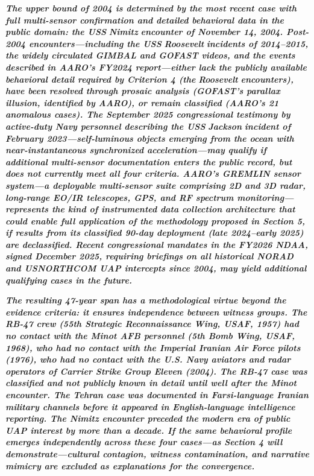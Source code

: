 \documentclass[11pt,letterpaper]{article}
\begin{document}
\textbf{\textit{The upper bound of 2004 is determined by the most recent case with full multi-sensor confirmation and detailed behavioral data in the public domain: the USS }}\textbf{\textit{Nimitz}}\textbf{\textit{ encounter of November 14, 2004. Post-2004 encounters---including the USS }}\textbf{\textit{Roosevelt}}\textbf{\textit{ incidents of 2014--2015, the widely circulated GIMBAL and GOFAST videos, and the events described in AARO's FY2024 report---either lack the publicly available behavioral detail required by Criterion 4 (the }}\textbf{\textit{Roosevelt}}\textbf{\textit{ encounters), have been resolved through prosaic analysis (GOFAST's parallax illusion, identified by AARO), or remain classified (AARO's 21 anomalous cases). The September 2025 congressional testimony by active-duty Navy personnel describing the USS }}\textbf{\textit{Jackson}}\textbf{\textit{ incident of February 2023---self-luminous objects emerging from the ocean with near-instantaneous synchronized acceleration---may qualify if additional multi-sensor documentation enters the public record, but does not currently meet all four criteria. AARO's GREMLIN sensor system---a deployable multi-sensor suite comprising 2D and 3D radar, long-range EO/IR telescopes, GPS, and RF spectrum monitoring---represents the kind of instrumented data collection architecture that could enable full application of the methodology proposed in Section 5, if results from its classified 90-day deployment (late 2024--early 2025) are declassified. Recent congressional mandates in the FY2026 NDAA, signed December 2025, requiring briefings on all historical NORAD and USNORTHCOM UAP intercepts since 2004, may yield additional qualifying cases in the future.}}


\textbf{\textit{The resulting 47-year span has a methodological virtue beyond the evidence criteria: it ensures independence between witness groups. The RB-47 crew (55th Strategic Reconnaissance Wing, USAF, 1957) had no contact with the Minot AFB personnel (5th Bomb Wing, USAF, 1968), who had no contact with the Imperial Iranian Air Force pilots (1976), who had no contact with the U.S. Navy aviators and radar operators of Carrier Strike Group Eleven (2004). The RB-47 case was classified and not publicly known in detail until well after the Minot encounter. The Tehran case was documented in Farsi-language Iranian military channels before it appeared in English-language intelligence reporting. The Nimitz encounter preceded the modern era of public UAP interest by more than a decade. If the same behavioral profile emerges independently across these four cases---as Section 4 will demonstrate---cultural contagion, witness contamination, and narrative mimicry are excluded as explanations for the convergence.}}
\end{document}
